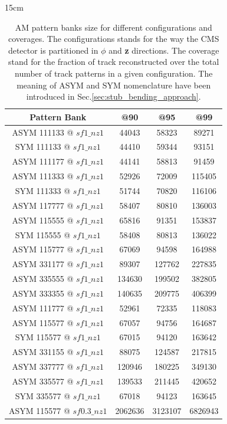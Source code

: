 \begin{table}[htbp]{15cm}
	\caption{AM pattern banks size for different configurations and coverages. The configurations stands for the way the CMS detector is partitioned in \textit{$\phi$} and \textbf{z} directions. The coverage stand for the fraction of track reconstructed over the total number of track patterns in a given configuration. The meaning of ASYM and SYM nomenclature have been introduced in Sec.\ref{sec:stub_bending_approach}.}
	\centering
	\begin{tabular}{c|c|c|c}
	\hline
	\hline
	Pattern Bank              & @90     & @95     & @99\\
	\hline
	ASYM 111133	@ $sf1\_nz1$   & 44043   & 58323   & 89271\\
	SYM  111133 @ $sf1\_nz1$   & 44410   & 59344   & 93151\\
	ASYM 111177	@ $sf1\_nz1$   & 44141   & 58813   & 91459\\
	ASYM 111333	@ $sf1\_nz1$   & 52926   & 72009   & 115405\\
	SYM  111333 @ $sf1\_nz1$   & 51744   & 70820   & 116106\\
	ASYM 117777	@ $sf1\_nz1$   & 58407   & 80810   & 136003\\
	ASYM 115555	@ $sf1\_nz1$   & 65816   & 91351   & 153837\\
	SYM  115555 @ $sf1\_nz1$   & 58408   & 80813   & 136022\\
	ASYM 115777	@ $sf1\_nz1$   & 67069   & 94598   & 164988\\
	ASYM 331177	@ $sf1\_nz1$   & 89307   & 127762  & 227835\\
	ASYM 335555	@ $sf1\_nz1$   & 134630  & 199502  & 382805\\
	ASYM 333355	@ $sf1\_nz1$   & 140635  & 209775  & 406399\\ 
	ASYM 111777 @ $sf1\_nz1$   & 52961   & 72335   & 118083\\
	ASYM 115577 @ $sf1\_nz1$   & 67057   & 94756   & 164687\\
	SYM  115577 @ $sf1\_nz1$   & 67015   & 94120   & 163642\\
	ASYM 331155 @ $sf1\_nz1$   & 88075   & 124587  & 217815\\
	ASYM 337777 @ $sf1\_nz1$   & 120946  & 180225  & 349130\\
	ASYM 335577 @ $sf1\_nz1$   & 139533  & 211445  & 420652\\
	SYM  335577	@ $sf1\_nz1$   & 67018   & 94123   & 163645\\
	\hline
	\hline
	ASYM 115577 @ $sf0.3\_nz1$ & 2062636 & 3123107 & 6826943\\ 

\end{tabular}
\end{table}
